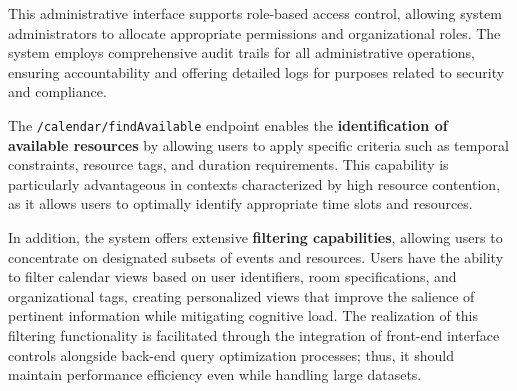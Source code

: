 This administrative interface supports role-based access control, allowing system administrators to allocate appropriate permissions and organizational roles.
The system employs comprehensive audit trails for all administrative operations, ensuring accountability and offering detailed logs for purposes related to security and compliance.

The \texttt{/calendar/findAvailable} endpoint enables the \textbf{identification of available resources} by allowing users to apply specific criteria such as temporal constraints, resource tags, and duration requirements.
This capability is particularly advantageous in contexts characterized by high resource contention, as it allows users to optimally identify appropriate time slots and resources.

In addition, the system offers extensive \textbf{filtering capabilities}, allowing users to concentrate on designated subsets of events and resources.
Users have the ability to filter calendar views based on user identifiers, room specifications, and organizational tags, creating personalized views that improve the salience of pertinent information while mitigating cognitive load.
The realization of this filtering functionality is facilitated through the integration of front-end interface controls alongside back-end query optimization processes; thus, it should maintain performance efficiency even while handling large datasets.
